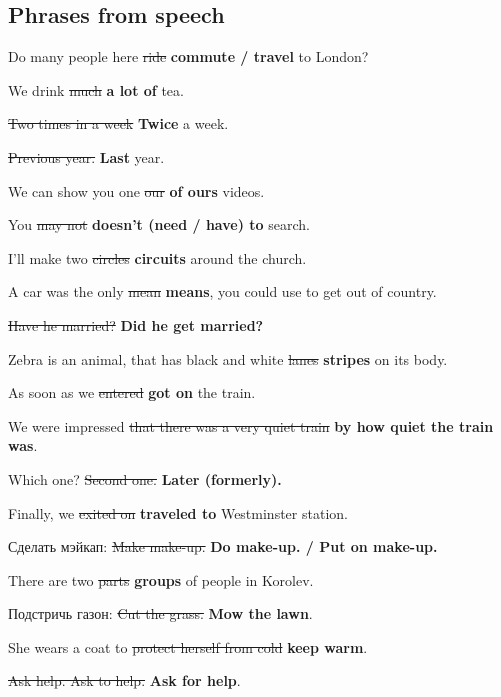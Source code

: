 \documentclass[10pt,a4paper]{article}
\newlength{\OriginalParIndent}
\begin{document}

\newpage
\setcounter{secnumdepth}{3} %

\subsection{Phrases from speech}
\begin{description}[leftmargin=\OriginalParIndent,style=nextline,before={\renewcommand\makelabel[1]{##1 ~--}}]
\item[] Do many people here \sout{ride} \textbf{commute / travel} to London?
\item[] We drink \sout{much} \textbf{a lot of} tea.
\item[] \sout{Two times in a week} \textbf{Twice} a week.
\item[] \sout{Previous year.} \textbf{Last} year.
\item[] We can show you one \sout{our} \textbf{of ours} videos.
\item[] You \sout{may not} \textbf{doesn't (need / have) to} search.
\item[] I'll make two \sout{circles} \textbf{circuits} around the church.
\item[] A car was the only \sout{mean} \textbf{means}, you could use to get out of country.
\item[] \sout{Have he married?} \textbf{Did he get married?}
\item[] Zebra is an animal, that has black and white \sout{lanes} \textbf{stripes} on its body.
\item[] As soon as we \sout{entered} \textbf{got on} the train.
\item[] We were impressed \sout{that there was a very quiet train} \textbf{by
        how quiet the train was}.
\item[] Which one? \sout{Second one.} \textbf{Later (formerly).}
\item[] Finally, we \sout{exited on} \textbf{traveled to} Westminster station.
\item[] Сделать мэйкап: \sout{Make make-up.} \textbf{Do make-up. / Put on make-up.}
\item[] There are two \sout{parts} \textbf{groups} of people in Korolev.
\item[] Подстричь газон: \sout{Cut the grass.} \textbf{Mow the lawn}.
\item[] She wears a coat to \sout{protect herself from cold} \textbf{keep warm}.
\item[] \sout{Ask help. Ask to help.} \textbf{Ask for help}.


\end{description}
\end{document}
